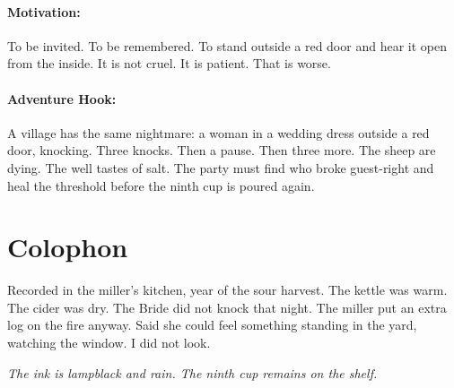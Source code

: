 \paragraph{Motivation:}

To be invited. To be remembered. To stand outside a red door and hear it open from the inside. It is not cruel. It is patient. That is worse.

\paragraph{Adventure Hook:}

A village has the same nightmare: a woman in a wedding dress outside a red door, knocking. Three knocks. Then a pause. Then three more. The sheep are dying. The well tastes of salt. The party must find who broke guest-right and heal the threshold before the ninth cup is poured again.

\section*{Colophon}

Recorded in the miller's kitchen, year of the sour harvest. The kettle was warm. The cider was dry. The Bride did not knock that night. The miller put an extra log on the fire anyway. Said she could feel something standing in the yard, watching the window. I did not look.

\noindent \textit{The ink is lampblack and rain. The ninth cup remains on the shelf.}